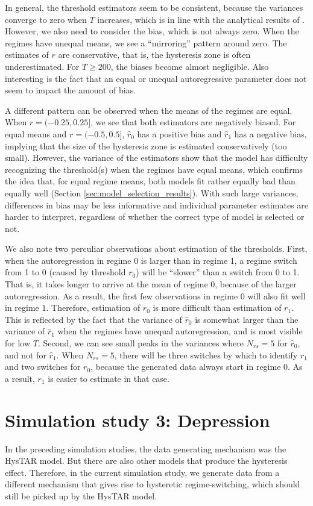 \documentclass{article}
\begin{document}
In general, the threshold estimators seem to be consistent, because the variances converge to zero when $T$ increases, which is in line with the analytical results of \cite{bar2}.
However, we also need to consider the bias, which is not always zero. 
When the regimes have unequal means, we see a ``mirroring'' pattern around zero. 
The estimates of $r$ are conservative, that is, the hysteresis zone is often underestimated.
For $T\ge 200$, the biases become almost negligible.
Also interesting is the fact that an equal or unequal autoregressive parameter does not seem to impact the amount of bias.

A different pattern can be observed when the means of the regimes are equal. When $r = (-0.25, 0.25]$, we see that both estimators are negatively biased.
For equal means and $r = (-0.5, 0.5]$, $\hat{r}_0$ has a positive bias and $\hat{r}_1$ has a negative bias, implying that the size of the hysteresis zone is estimated conservatively (too small).
However, the variance of the estimators show that the model has difficulty recognizing the threshold(s) when the regimes have equal means, which confirms the idea that, for equal regime means, both models fit rather equally bad than equally well (Section \ref{sec:model_selection_results}).
With such large variances, differences in bias may be less informative and individual parameter estimates are harder to interpret, regardless of whether the correct type of model is selected or not.

We also note two perculiar observations about estimation of the thresholds. 
First, when the autoregression in regime 0 is larger than in regime 1, a regime switch from 1 to 0 (caused by threshold $r_0$) will be ``slower'' than a switch from 0 to 1. That is, it takes longer to arrive at the mean of regime 0, because of the larger autoregression. 
As a result, the first few observations in regime 0 will also fit well in regime 1. Therefore, estimation of $r_0$ is more difficult than estimation of $r_1$. 
This is reflected by the fact that the variance of $\hat{r}_0$ is somewhat larger than the variance of $\hat{r}_1$ when the regimes have unequal autoregression, and is most visible for low $T$.
Second, we can see small peaks in the variances where $N_{rs} = 5$ for $\hat{r}_0$, and not for $\hat{r}_1$. 
When $N_{rs} = 5$, there will be three switches by which to identify $r_1$ and two switches for $r_0$, because the generated data always start in regime 0. As a result, $r_1$ is easier to estimate in that case.

\section{Simulation study 3: Depression} 
\label{sec:simulation_study_3}
In the preceding simulation studies, the data generating mechanism was the HysTAR model. 
But there are also other models that produce the hysteresis effect.
Therefore, in the current simulation study, we generate data from a different mechanism that gives rise to hysteretic regime-switching, which should still be picked up by the HysTAR model.
\end{document}
